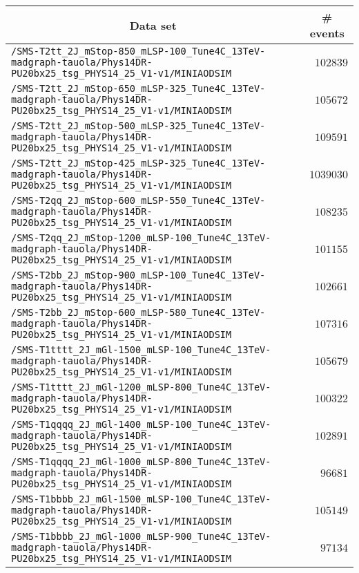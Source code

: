 \begin{center}
\begin{tabular}{lr}
\toprule
\multicolumn{1}{c}{Data set}&\multicolumn{1}{c}{\# events}\tabularnewline
\midrule
\verb!/SMS-T2tt_2J_mStop-850_mLSP-100_Tune4C_13TeV-madgraph-tauola/Phys14DR-PU20bx25_tsg_PHYS14_25_V1-v1/MINIAODSIM! &$ 102839$\tabularnewline
\verb!/SMS-T2tt_2J_mStop-650_mLSP-325_Tune4C_13TeV-madgraph-tauola/Phys14DR-PU20bx25_tsg_PHYS14_25_V1-v1/MINIAODSIM! &$ 105672$\tabularnewline
\verb!/SMS-T2tt_2J_mStop-500_mLSP-325_Tune4C_13TeV-madgraph-tauola/Phys14DR-PU20bx25_tsg_PHYS14_25_V1-v1/MINIAODSIM! &$ 109591$\tabularnewline
\verb!/SMS-T2tt_2J_mStop-425_mLSP-325_Tune4C_13TeV-madgraph-tauola/Phys14DR-PU20bx25_tsg_PHYS14_25_V1-v1/MINIAODSIM! &$1039030$\tabularnewline
\verb!/SMS-T2qq_2J_mStop-600_mLSP-550_Tune4C_13TeV-madgraph-tauola/Phys14DR-PU20bx25_tsg_PHYS14_25_V1-v1/MINIAODSIM! &$ 108235$\tabularnewline
\verb!/SMS-T2qq_2J_mStop-1200_mLSP-100_Tune4C_13TeV-madgraph-tauola/Phys14DR-PU20bx25_tsg_PHYS14_25_V1-v1/MINIAODSIM! &$ 101155$\tabularnewline
\verb!/SMS-T2bb_2J_mStop-900_mLSP-100_Tune4C_13TeV-madgraph-tauola/Phys14DR-PU20bx25_tsg_PHYS14_25_V1-v1/MINIAODSIM! &$ 102661$\tabularnewline
\verb!/SMS-T2bb_2J_mStop-600_mLSP-580_Tune4C_13TeV-madgraph-tauola/Phys14DR-PU20bx25_tsg_PHYS14_25_V1-v1/MINIAODSIM! &$ 107316$\tabularnewline
\verb!/SMS-T1tttt_2J_mGl-1500_mLSP-100_Tune4C_13TeV-madgraph-tauola/Phys14DR-PU20bx25_tsg_PHYS14_25_V1-v1/MINIAODSIM! &$ 105679$\tabularnewline
\verb!/SMS-T1tttt_2J_mGl-1200_mLSP-800_Tune4C_13TeV-madgraph-tauola/Phys14DR-PU20bx25_tsg_PHYS14_25_V1-v1/MINIAODSIM! &$ 100322$\tabularnewline
\verb!/SMS-T1qqqq_2J_mGl-1400_mLSP-100_Tune4C_13TeV-madgraph-tauola/Phys14DR-PU20bx25_tsg_PHYS14_25_V1-v1/MINIAODSIM! &$ 102891$\tabularnewline
\verb!/SMS-T1qqqq_2J_mGl-1000_mLSP-800_Tune4C_13TeV-madgraph-tauola/Phys14DR-PU20bx25_tsg_PHYS14_25_V1-v1/MINIAODSIM! &$  96681$\tabularnewline
\verb!/SMS-T1bbbb_2J_mGl-1500_mLSP-100_Tune4C_13TeV-madgraph-tauola/Phys14DR-PU20bx25_tsg_PHYS14_25_V1-v1/MINIAODSIM! &$ 105149$\tabularnewline
\verb!/SMS-T1bbbb_2J_mGl-1000_mLSP-900_Tune4C_13TeV-madgraph-tauola/Phys14DR-PU20bx25_tsg_PHYS14_25_V1-v1/MINIAODSIM! &$  97134$\tabularnewline
\bottomrule
\end{tabular}\end{center}
